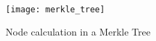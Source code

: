 \begin{figure}[H]
    \centering
    \texttt{[image: merkle\_tree]}
    \caption{Node calculation in a Merkle Tree~\cite{smartproperty}}
    \label{fig:Merkletree}
\end{figure}

